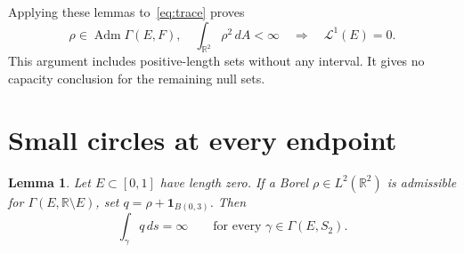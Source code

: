 \documentclass[11pt]{article}
\newtheorem{lemma}{Lemma}
\newcommand{\R}{\mathbb R}
\newcommand{\ind}{\mathbf 1}
\newcommand{\Adm}{\operatorname{Adm}}
\newcommand{\length}{\mathcal L^1}
\begin{document}
Applying these lemmas to~\eqref{eq:trace} proves
\begin{equation}\label{eq:null}
 \rho\in\Adm\Gamma(E,F),\quad \int_{\R^2}\rho^2\,dA<\infty
 \quad\Longrightarrow\quad\length(E)=0.
\end{equation}
This argument includes positive-length sets without any interval. It gives
no capacity conclusion for the remaining null sets.

\section{Small circles at every endpoint}\label{sec:circles}

\begin{lemma}\label{lem:circles}
Let $E\subset[0,1]$ have length zero. If a Borel $\rho\in L^2(\R^2)$ is
admissible for $\Gamma(E,\R\setminus E)$, set
$q=\rho+\ind_{B(0,3)}$. Then
\begin{equation}\label{eq:infinitecost}
 \int_\gamma q\,ds=\infty
 \qquad\text{for every }\gamma\in\Gamma(E,S_2).
\end{equation}
\end{lemma}
\end{document}
